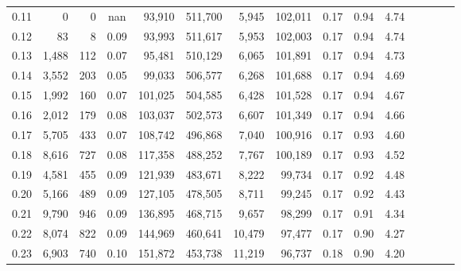 \begin{tabular}{rrrcrrrrrrrrrrr}
0.11 &       0 &      0 &                                        nan &   93,910 &  511,700 &    5,945 &  102,011 &  0.17 &  0.94 &                         4.74 \\
0.12 &      83 &      8 &                                       0.09 &   93,993 &  511,617 &    5,953 &  102,003 &  0.17 &  0.94 &                         4.74 \\
0.13 &   1,488 &    112 &                                       0.07 &   95,481 &  510,129 &    6,065 &  101,891 &  0.17 &  0.94 &                         4.73 \\
0.14 &   3,552 &    203 &                                       0.05 &   99,033 &  506,577 &    6,268 &  101,688 &  0.17 &  0.94 &                         4.69 \\
0.15 &   1,992 &    160 &                                       0.07 &  101,025 &  504,585 &    6,428 &  101,528 &  0.17 &  0.94 &                         4.67 \\
0.16 &   2,012 &    179 &                                       0.08 &  103,037 &  502,573 &    6,607 &  101,349 &  0.17 &  0.94 &                         4.66 \\
0.17 &   5,705 &    433 &                                       0.07 &  108,742 &  496,868 &    7,040 &  100,916 &  0.17 &  0.93 &                         4.60 \\
0.18 &   8,616 &    727 &                                       0.08 &  117,358 &  488,252 &    7,767 &  100,189 &  0.17 &  0.93 &                         4.52 \\
0.19 &   4,581 &    455 &                                       0.09 &  121,939 &  483,671 &    8,222 &   99,734 &  0.17 &  0.92 &                         4.48 \\
0.20 &   5,166 &    489 &                                       0.09 &  127,105 &  478,505 &    8,711 &   99,245 &  0.17 &  0.92 &                         4.43 \\
0.21 &   9,790 &    946 &                                       0.09 &  136,895 &  468,715 &    9,657 &   98,299 &  0.17 &  0.91 &                         4.34 \\
0.22 &   8,074 &    822 &                                       0.09 &  144,969 &  460,641 &   10,479 &   97,477 &  0.17 &  0.90 &                         4.27 \\
0.23 &   6,903 &    740 &                                       0.10 &  151,872 &  453,738 &   11,219 &   96,737 &  0.18 &  0.90 &                         4.20 \\

\end{tabular}
